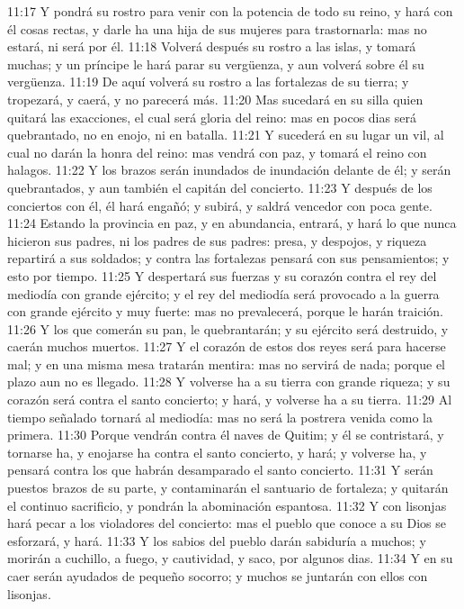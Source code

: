 11:17 Y pondrá su rostro para venir con la potencia de todo su reino, y hará con él cosas rectas, y darle ha una hija de sus mujeres para trastornarla: mas no estará, ni será por él.
11:18 Volverá después su rostro a las islas, y tomará muchas; y un príncipe le hará parar su vergüenza, y aun volverá sobre él su vergüenza.
11:19 De aquí volverá su rostro a las fortalezas de su tierra; y tropezará, y caerá, y no parecerá más.
11:20 Mas sucedará en su silla quien quitará las exacciones, el cual será gloria del reino: mas en pocos dias será quebrantado, no en enojo, ni en batalla.
11:21 Y sucederá en su lugar un vil, al cual no darán la honra del reino: mas vendrá con paz, y tomará el reino con halagos.
11:22 Y los brazos serán inundados de inundación delante de él; y serán quebrantados, y aun también el capitán del concierto.
11:23 Y después de los conciertos con él, él hará engañó; y subirá, y saldrá vencedor con poca gente.
11:24 Estando la provincia en paz, y en abundancia, entrará, y hará lo que nunca hicieron sus padres, ni los padres de sus padres: presa, y despojos, y riqueza repartirá a sus soldados; y contra las fortalezas pensará con sus pensamientos; y esto por tiempo.
11:25 Y despertará sus fuerzas y su corazón contra el rey del mediodía con grande ejército; y el rey del mediodía será provocado a la guerra con grande ejército y muy fuerte: mas no prevalecerá, porque le harán traición.
11:26 Y los que comerán su pan, le quebrantarán; y su ejército será destruido, y caerán muchos muertos.
11:27 Y el corazón de estos dos reyes será para hacerse mal; y en una misma mesa tratarán mentira: mas no servirá de nada; porque el plazo aun no es llegado.
11:28 Y volverse ha a su tierra con grande riqueza; y su corazón será contra el santo concierto; y hará, y volverse ha a su tierra.
11:29 Al tiempo señalado tornará al mediodía: mas no será la postrera venida como la primera.
11:30 Porque vendrán contra él naves de Quitim; y él se contristará, y tornarse ha, y enojarse ha contra el santo concierto, y hará; y volverse ha, y pensará contra los que habrán desamparado el santo concierto.
11:31 Y serán puestos brazos de su parte, y contaminarán el santuario de fortaleza; y quitarán el continuo sacrificio, y pondrán la abominación espantosa.
11:32 Y con lisonjas hará pecar a los violadores del concierto: mas el pueblo que conoce a su Dios se esforzará, y hará.
11:33 Y los sabios del pueblo darán sabiduría a muchos; y morirán a cuchillo, a fuego, y cautividad, y saco, por algunos dias.
11:34 Y en su caer serán ayudados de pequeño socorro; y muchos se juntarán con ellos con lisonjas.
